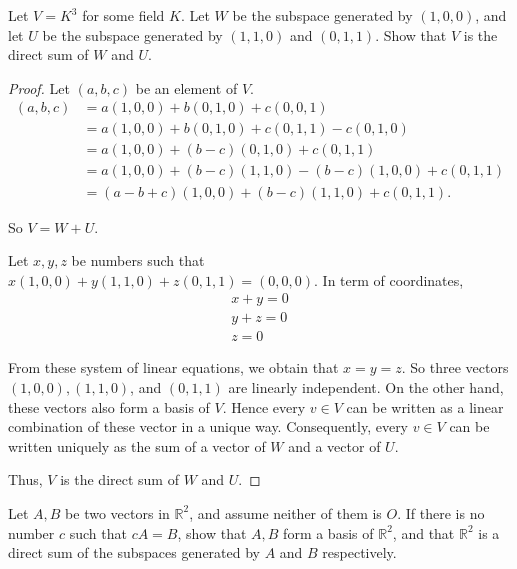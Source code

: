 \begin{exercise}
    Let $V = K^{3}$ for some field $K$. Let $W$ be the subspace generated by $(1, 0, 0)$, and let $U$ be the subspace generated by $(1, 1, 0)$ and $(0, 1, 1)$. Show that $V$ is the direct sum of $W$ and $U$.
\end{exercise}

\begin{proof}
    Let $(a, b, c)$ be an element of $V$.
    \begin{align*}
        (a, b, c) & = a(1, 0, 0) + b(0, 1, 0) + c(0, 0, 1)                      \\
                  & = a(1, 0, 0) + b(0, 1, 0) + c(0, 1, 1) - c(0, 1, 0)         \\
                  & = a(1, 0, 0) + (b-c)(0, 1, 0) + c(0, 1, 1)                  \\
                  & = a(1, 0, 0) + (b-c)(1, 1, 0) - (b-c)(1, 0, 0) + c(0, 1, 1) \\
                  & = (a-b+c)(1, 0, 0) + (b-c)(1, 1, 0) + c(0, 1, 1).
    \end{align*}

    So $V = W + U$.

    Let $x, y, z$ be numbers such that $x(1, 0, 0) + y(1, 1, 0) + z(0, 1, 1) = (0, 0, 0)$. In term of coordinates,
    \[
        \begin{split}
            x + y = 0 \\
            y + z = 0 \\
            z = 0
        \end{split}
    \]

    From these system of linear equations, we obtain that $x = y = z$. So three vectors $(1, 0, 0), (1, 1, 0)$, and $(0, 1, 1)$ are linearly independent. On the other hand, these vectors also form a basis of $V$. Hence every $v\in V$ can be written as a linear combination of these vector in a unique way. Consequently, every $v\in V$ can be written uniquely as the sum of a vector of $W$ and a vector of $U$.

    Thus, $V$ is the direct sum of $W$ and $U$.
\end{proof}

\begin{exercise}
    Let $A, B$ be two vectors in $\mathbb{R}^{2}$, and assume neither of them is $O$. If there is no number $c$ such that $cA = B$, show that $A, B$ form a basis of $\mathbb{R}^{2}$, and that $\mathbb{R}^{2}$ is a direct sum of the subspaces generated by $A$ and $B$ respectively.
\end{exercise}

